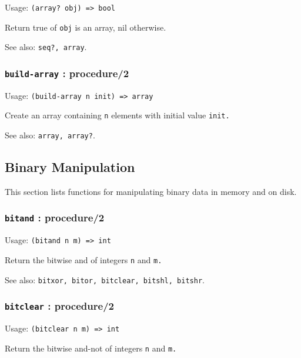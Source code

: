 \documentclass[
]{article}
\newcommand{\passthrough}[1]{#1}
\begin{document}
Usage: \passthrough{\lstinline!(array? obj) => bool!}

Return true of \passthrough{\lstinline!obj!} is an array, nil otherwise.

See also: \passthrough{\lstinline!seq?, array!}.

\hypertarget{build-array-procedure2}{%
\subsubsection{\texorpdfstring{\texttt{build-array} :
procedure/2}{build-array : procedure/2}}\label{build-array-procedure2}}

Usage: \passthrough{\lstinline!(build-array n init) => array!}

Create an array containing \passthrough{\lstinline!n!} elements with
initial value \passthrough{\lstinline!init.!}

See also: \passthrough{\lstinline!array, array?!}.

\hypertarget{binary-manipulation}{%
\subsection{Binary Manipulation}\label{binary-manipulation}}

This section lists functions for manipulating binary data in memory and
on disk.

\hypertarget{bitand-procedure2}{%
\subsubsection{\texorpdfstring{\texttt{bitand} :
procedure/2}{bitand : procedure/2}}\label{bitand-procedure2}}

Usage: \passthrough{\lstinline!(bitand n m) => int!}

Return the bitwise and of integers \passthrough{\lstinline!n!} and
\passthrough{\lstinline!m.!}

See also:
\passthrough{\lstinline!bitxor, bitor, bitclear, bitshl, bitshr!}.

\hypertarget{bitclear-procedure2}{%
\subsubsection{\texorpdfstring{\texttt{bitclear} :
procedure/2}{bitclear : procedure/2}}\label{bitclear-procedure2}}

Usage: \passthrough{\lstinline!(bitclear n m) => int!}

Return the bitwise and-not of integers \passthrough{\lstinline!n!} and
\passthrough{\lstinline!m.!}
\end{document}

